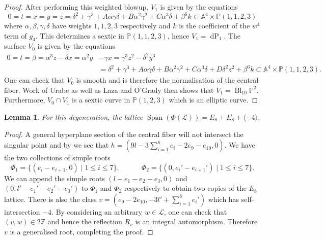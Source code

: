 \documentclass[a4paper]{amsart}
\theoremstyle{definition}
\theoremstyle{plain}
\newtheorem{lemma}[defn]{Lemma}
\theoremstyle{remark}
\newcommand{\PS}{\mathbb{P}}
\newcommand{\Z}{\mathbb{Z}}
\newcommand{\A}{\mathbb{A}}
\begin{document}
\begin{proof}
After performing this weighted blowup, $V_1$ is given by the equations
$$0=t=x=y=z=\delta^2 +\gamma ^3 +A\alpha\gamma\delta +B\alpha^2\gamma^2+C\alpha^3\delta+\beta^6 k  \subset \mathbb{A}^4 \times \mathbb{P}(1,1,2,3)$$
where $\alpha,\beta,\gamma,\delta$ have weights $1,1,2,3$ respectively and $k$ is the coefficient of the $w^4$ term of $g_4$. This determines a sextic in $\PS(1,1,2,3)$, hence $V_1 = \operatorname{dP}_1$. The surface $V_0$ is given by the equations
\begin{align*}
0=t=\beta=\alpha^3z-\delta x=\alpha^2y&-\gamma x=\gamma^3z^2-\delta^2y^3\\
&=\delta^2 +\gamma ^3 +A\alpha\gamma\delta +B\alpha^2\gamma^2+C\alpha^3\delta+D\delta^2z^2+\beta^6 k \subset \A^4\times\PS(1,1,2,3).
\end{align*}
One can check that $V_0$ is smooth and is therefore the normalisation of the central fiber. Work of Urabe \cite[Proposition 1.5, p.1192]{Ura84} as well as Laza and O'Grady \cite[Remark 4.2]{LOG19} then shows that $V_1=\operatorname{Bl}_{10}\PS^2$. Furthermore, $V_0 \cap V_1$ is a sextic curve in $\PS(1,2,3)$ which is an elliptic curve.
\end{proof}

\begin{lemma}\label{lemma:root lattice E8E8}
For this degeneration, the lattice $\operatorname{Span}(\Phi(\mathscr{L}))=E_8+E_8+\langle -4 \rangle$.
\end{lemma}

\begin{proof}
A general hyperplane section of the central fiber will not intersect the singular point and by \cite[Proposition 4.3]{Ura84} we see that $h=(9l-3\sum_{i=1}^8e_i-2e_9-e_{10},0)$. We have the two collections of simple roots
$$\Phi_1 = \{(e_i-e_{i+1},0) \mid 1\leq i\leq 7\}, \qquad  \quad \Phi_2 = \{(0,e_i'-e_{i+1}') \mid 1\leq i\leq 7\}.$$ 
We can append the simple roots $(l-e_1-e_2-e_3,0)$ and $(0,l'-e_1'-e_2'-e_3')$ to $\Phi_1$ and $\Phi_2$ respectively to obtain two copies of the $E_8$ lattice. There is also the class $v=(e_9-2e_{10},-3l'+\sum_{i=1}^8e_i')$ which has self-intersection $-4$. By considering an arbitrary $w \in \mathscr{L}$, one can check that $(v,w)\in 2\Z$ and hence the reflection $R_v$ is an integral automorphism. Therefore $v$ is a generalised root, completing the proof.
\end{proof}
\end{document}
